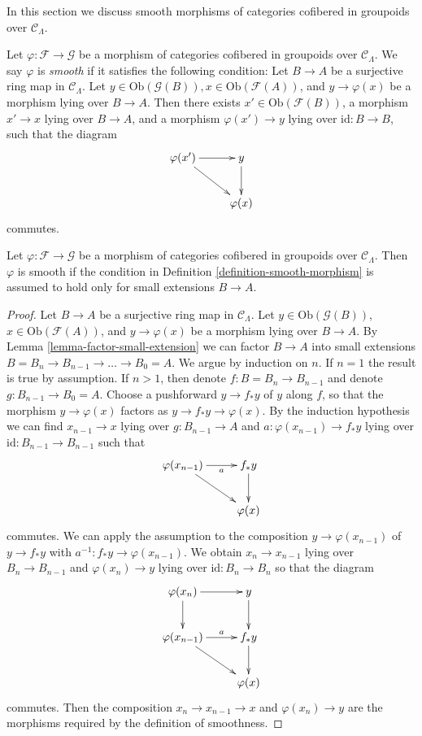 \noindent
In this section we discuss smooth morphisms of categories 
cofibered in groupoids over $\mathcal{C}_\Lambda$.

\begin{definition}
\label{definition-smooth-morphism}
Let $\varphi: \mathcal{F} \to \mathcal{G}$ be a morphism of categories 
cofibered in groupoids over $\mathcal{C}_\Lambda$.  We say  $\varphi$ is 
{\it smooth} if it satisfies the following condition: Let $B \to A$ be 
a surjective ring map in $\mathcal{C}_\Lambda$.  Let $y \in 
\text{Ob}(\mathcal{G}(B)), x \in \text{Ob}(\mathcal{F}(A))$, and $y 
\to \varphi(x)$ be a morphism lying over $B \to A$.  Then there 
exists $x' \in \text{Ob}(\mathcal{F}(B))$, a morphism $x' \to x$ 
lying over $B \to A$, and a morphism $\varphi(x') \to y$ lying 
over $\text{id}: B \to B$, such that the diagram
$$
\xymatrix{
\varphi(x') \ar[r] \ar[dr] & y \ar[d] \\
& \varphi(x)
}
$$
commutes.
\end{definition}

\begin{lemma}
\label{lemma-smoothness-small-extensions}
Let $\varphi: \mathcal{F} \to \mathcal{G}$ be a morphism of categories 
cofibered in groupoids over $\mathcal{C}_\Lambda$.  Then $\varphi$ is smooth 
if the condition in Definition \ref{definition-smooth-morphism} is assumed to 
hold only for small extensions $B \to A$.
\end{lemma}

\begin{proof}
Let $B \to A$ be a surjective ring map in $\mathcal{C}_\Lambda$.
Let $y \in \text{Ob}(\mathcal{G}(B))$, $x \in \text{Ob}(\mathcal{F}(A))$, 
and $y \to \varphi(x)$ be a morphism lying over $B \to A$. By 
Lemma \ref{lemma-factor-small-extension} we can factor $B \to A$ into 
small extensions $B = B_n \to B_{n-1} \to \ldots \to B_0 = A$.
We argue by induction on $n$. If $n = 1$ the result is true by assumption.
If $n > 1$, then denote $f : B = B_n \to B_{n - 1}$ and denote
$g : B_{n - 1} \to B_0 = A$. Choose a pushforward
$y \to f_* y$ of $y$ along $f$, so that the morphism $y \to \varphi(x)$
factors as $y \to f_* y \to \varphi(x)$. By the induction hypothesis
we can find $x_{n - 1} \to x$ lying over $g : B_{n - 1} \to A$ and
$a : \varphi(x_{n - 1}) \to f_*y$ lying over
$\text{id} : B_{n - 1} \to B_{n - 1}$ such that
$$
\xymatrix{
\varphi(x_{n - 1}) \ar[r]_-a \ar[dr] & f_*y \ar[d] \\
& \varphi(x)
}
$$
commutes. We can apply the assumption to the composition
$y \to \varphi(x_{n - 1})$ of
$y \to f_*y$ with $a^{-1} : f_*y \to \varphi(x_{n - 1})$. We obtain
$x_n \to x_{n - 1}$ lying over $B_n \to B_{n - 1}$ and
$\varphi(x_n) \to y$ lying over  $\text{id} : B_n \to B_n$ so that the diagram
$$
\xymatrix{
\varphi(x_n) \ar[r] \ar[d] & y \ar[d] \\
\varphi(x_{n - 1}) \ar[r]^-a \ar[dr] & f_*y \ar[d] \\
& \varphi(x)
}
$$ 
commutes. Then the composition $x_n \to x_{n - 1} \to x$ and 
$\varphi(x_n) \to y$ are the morphisms required by the definition of 
smoothness.
\end{proof}

